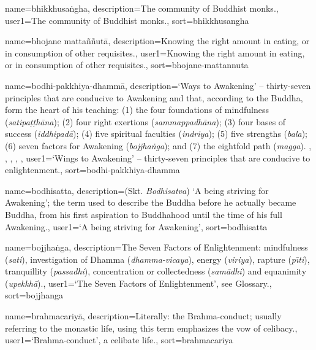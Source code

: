 {
name=bhikkhusa\.{n}gha,
description={The community of Buddhist monks.},
user1={The community of Buddhist monks.},
sort={bhikkhusangha}
}

{
name={bhojane matta\~n\~nut\=a},
description={Knowing the right amount in eating, or in consumption of other requisites.},
user1={Knowing the right amount in eating, or in consumption of other requisites.},
sort={bhojane-mattannuta}
}

{
name={bodhi-pakkhiya-dhamm\=a},
description={`Ways to Awakening' -- thirty-seven principles that are conducive to Awakening and that, according to the Buddha, form the heart of his teaching: (1) the four foundations of mindfulness (\textit{satipa\d{t}\d{t}h\=ana}); (2) four right exertions (\textit{sammappadh\=ana}); (3) four bases of success (\textit{iddhipad\=a}); (4) five spiritual faculties (\textit{indriya}); (5) five strengths (\textit{bala}); (6) seven factors for Awakening (\textit{bojjha\.{n}ga}); and (7) the eightfold path (\textit{magga}). \protect \seepre %
\protect {}, \protect {}, \protect {}, \protect {}, \protect {}%
\protect \seepost %
},
user1={`Wings to Awakening' -- thirty-seven principles that are conducive to enlightenment.},
sort={bodhi-pakkhiya-dhamma}
}

{
name={bodhisatta},
description={(Skt. \textit{Bodhisatva}) `A being striving for Awakening'; the term used to describe the Buddha before he actually became Buddha, from his first aspiration to Buddhahood until the time of his full Awakening.},
user1={`A being striving for Awakening'},
sort={bodhisatta}
}

{
name=bojjha\.nga,
description={The Seven Factors of Enlightenment: mindfulness (\textit{sati}), investigation of Dhamma (\textit{dhamma-vicaya}), energy (\textit{viriya}), rapture (\textit{p\={\i}ti}), tranquillity (\textit{passadhi}), concentration or collectedness (\textit{sam\=adhi}) and equanimity (\textit{upekkh\=a}).},
user1={`The Seven Factors of Enlightenment', see Glossary.},
sort={bojjhanga}
}

{
name=brahmacariy\=a,
description={Literally: the Brahma-conduct; usually referring to the monastic life, using this term emphasizes the vow of celibacy.},
user1={`Brahma-conduct', a celibate life.},
sort={brahmacariya}
}


